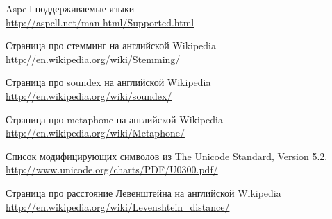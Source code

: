 \begin{thebibliography}{99}
 Aspell поддерживаемые языки\\
\url{http://aspell.net/man-html/Supported.html}

 Страница про стемминг на английской Wikipedia\\
 \url{http://en.wikipedia.org/wiki/Stemming/}

 Страница про soundex на английской Wikipedia\\
 \url{http://en.wikipedia.org/wiki/soundex/}

 Страница про metaphone на английской Wikipedia\\
 \url{http://en.wikipedia.org/wiki/Metaphone/}

 Список модифицирующих символов из The Unicode Standard, Version 5.2. \\
 \url{http://www.unicode.org/charts/PDF/U0300.pdf/}

 Страница про расстояние Левенштейна на английской Wikipedia\\
 \url{http://en.wikipedia.org/wiki/Levenshtein_distance/}


\end{thebibliography}